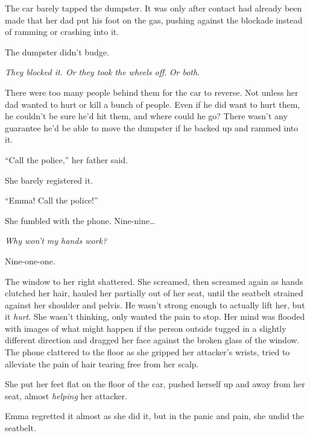The car barely tapped the dumpster.  It was only after contact had already been made that her dad put his foot on the gas, pushing against the blockade instead of ramming or crashing into it.



The dumpster didn't budge.



\emph{They blocked it.  Or they took the wheels off}.  \emph{Or both}.



There were too many people behind them for the car to reverse.  Not unless her dad wanted to hurt or kill a bunch of people.  Even if he did want to hurt them, he couldn't be sure he'd hit them, and where could he go?  There wasn't any guarantee he'd be able to move the dumpster if he backed up and rammed into it.



``Call the police,'' her father said.



She barely registered it.



``Emma!  Call the police!''



She fumbled with the phone.  Nine-nine\ldots



\emph{Why won't my hands work?}



Nine-one-one.



The window to her right shattered.  She screamed, then screamed again as hands clutched her hair, hauled her partially out of her seat, until the seatbelt strained against her shoulder and pelvis.  He wasn't strong enough to actually lift her, but it \emph{hurt}.  She wasn't thinking, only wanted the pain to stop.  Her mind was flooded with images of what might happen if the person outside tugged in a slightly different direction and dragged her face against the broken glass of the window.  The phone clattered to the floor as she gripped her attacker's wrists, tried to alleviate the pain of hair tearing free from her scalp.



She put her feet flat on the floor of the car, pushed herself up and away from her seat, almost \emph{helping} her attacker.



Emma regretted it almost as she did it, but in the panic and pain, she undid the seatbelt.



